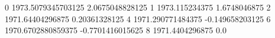 0 1973.5079345703125 2.0675048828125
1 1973.115234375 1.6748046875
2 1971.64404296875 0.20361328125
4 1971.290771484375 -0.149658203125
6 1970.6702880859375 -0.7701416015625
8 1971.4404296875 0.0
